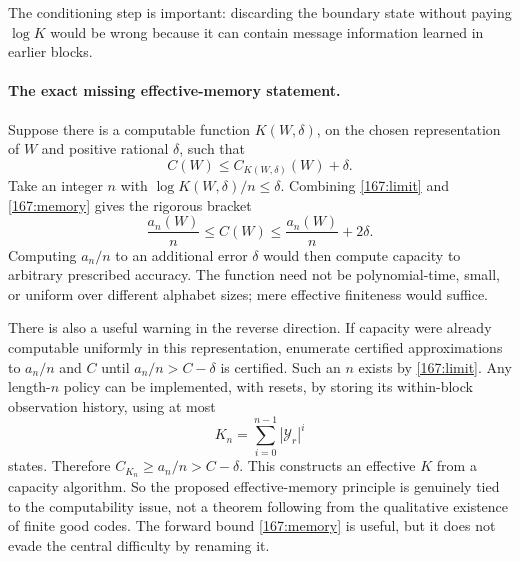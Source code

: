 \documentclass[11pt,a4paper]{article}
\numberwithin{equation}{section}
\begin{document}
The conditioning step is important: discarding the boundary state
without paying $\log K$ would be wrong because it can contain message
information learned in earlier blocks.

\paragraph{The exact missing effective-memory statement.}
Suppose there is a computable function $K(W,\delta)$, on the chosen
representation of $W$ and positive rational $\delta$, such that
\begin{equation}\label{167:modulus}
 C(W)\leq C_{K(W,\delta)}(W)+\delta.
\end{equation}
Take an integer $n$ with $\log K(W,\delta)/n\leq\delta$. Combining
\eqref{167:limit} and \eqref{167:memory} gives the rigorous bracket
\begin{equation}
 \frac{a_n(W)}n\leq C(W)
 \leq\frac{a_n(W)}n+2\delta.
\end{equation}
Computing $a_n/n$ to an additional error $\delta$ would then compute
capacity to arbitrary prescribed accuracy. The function need not be
polynomial-time, small, or uniform over different alphabet sizes; mere
effective finiteness would suffice.

There is also a useful warning in the reverse direction. If capacity
were already computable uniformly in this representation, enumerate
certified approximations to $a_n/n$ and $C$ until
$a_n/n>C-\delta$ is certified. Such an $n$ exists by
\eqref{167:limit}. Any length-$n$ policy can be implemented, with resets,
by storing its within-block observation history, using at most
\begin{equation}
 K_n=\sum_{i=0}^{n-1}|\mathcal Y_r|^i
\end{equation}
states. Therefore $C_{K_n}\geq a_n/n>C-\delta$. This constructs an
effective $K$ from a capacity algorithm. So the proposed effective-memory
principle is genuinely tied to the computability issue, not a theorem
following from the qualitative existence of finite good codes. The
forward bound \eqref{167:memory} is useful, but it does not evade the
central difficulty by renaming it.
\end{document}
